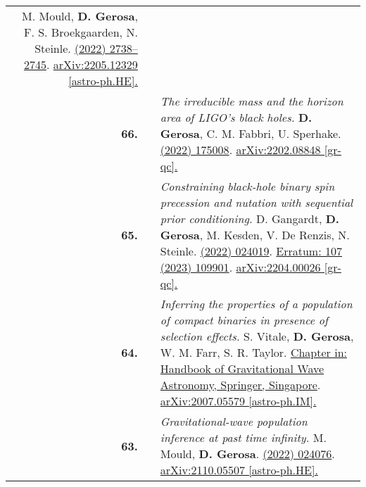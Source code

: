 {\begin{longtable}{rp{0.3cm}p{15.8cm}}
\newline{}
M. Mould, \textbf{D. Gerosa}, F. S. Broekgaarden, N. Steinle.
\newline{}
\href{https://doi.org/10.1093/mnras/stac2859}{\mnras 517 (2022) 2738–2745}. \href{https://arxiv.org/abs/2205.12329}{arXiv:2205.12329 [astro-ph.HE].}
\vspace{0.09cm}\\
%
\textbf{66.} & & \textit{The irreducible mass and the horizon area of LIGO's black holes.}
\newline{}
\textbf{D. Gerosa}, C. M. Fabbri, U. Sperhake.
\newline{}
\href{https://iopscience.iop.org/article/10.1088/1361-6382/ac8332}{\cqg 39 (2022) 175008}. \href{https://arxiv.org/abs/2202.08848}{arXiv:2202.08848 [gr-qc].}
\vspace{0.09cm}\\
%
\textbf{65.} & & \textit{Constraining black-hole binary spin precession and nutation with sequential prior conditioning.}
\newline{}
D. Gangardt, \textbf{D. Gerosa}, M. Kesden, V. De Renzis, N. Steinle.
\newline{}
\href{https://journals.aps.org/prd/abstract/10.1103/PhysRevD.106.024019}{\prd 106 (2022) 024019}. \href{https://journals.aps.org/prd/abstract/10.1103/PhysRevD.107.109901}{Erratum: 107 (2023) 109901}. \href{https://arxiv.org/abs/2204.00026}{arXiv:2204.00026 [gr-qc].}
\vspace{0.09cm}\\
%
\textbf{64.} & & \textit{Inferring the properties of a population of compact binaries in presence of selection effects.}
\newline{}
S. Vitale, \textbf{D. Gerosa}, W. M. Farr, S. R. Taylor.
\newline{}
\href{https://doi.org/10.1007/978-981-15-4702-7_45-1}{Chapter in: Handbook of Gravitational Wave Astronomy, Springer, Singapore}. \href{https://arxiv.org/abs/2007.05579}{arXiv:2007.05579 [astro-ph.IM].}
\vspace{0.09cm}\\
%
\textbf{63.} & & \textit{Gravitational-wave population inference at past time infinity.}
\newline{}
M. Mould, \textbf{D. Gerosa}.
\newline{}
\href{https://journals.aps.org/prd/abstract/10.1103/PhysRevD.105.024076}{\prd 105 (2022) 024076}. \href{https://arxiv.org/abs/2110.05507}{arXiv:2110.05507 [astro-ph.HE].}
\vspace{0.09cm}\\

\end{longtable}}
